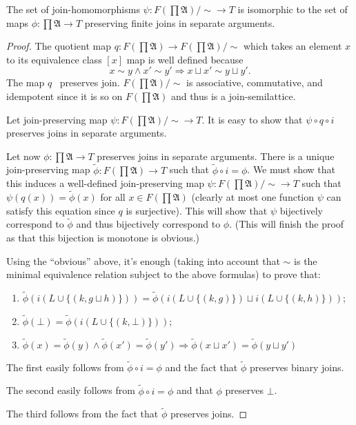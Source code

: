 \begin{lem}
  The set of join-homomorphisms $\psi : F \left( \prod \mathfrak{A} \right) / \sim
  \rightarrow T$ is isomorphic to the set of maps $\phi :
  \prod \mathfrak{A} \rightarrow T$ preserving finite joins in separate arguments.
\end{lem}

\begin{proof}
  The quotient map $q : F \left( \prod \mathfrak{A} \right) \rightarrow F
  \left( \prod \mathfrak{A} \right) / \sim$ which takes an element $x$ to its
  equivalence class $[x]$ map is well defined because
  \[ x \sim y \wedge x' \sim y' \Rightarrow x \sqcup x' \sim y \sqcup y' . \]
  The map $q$ \ preserves join. $F \left( \prod \mathfrak{A} \right) / \sim$
  is associative, commutative, and idempotent since it is so on $F \left(
  \prod \mathfrak{A} \right)$ and thus is a join-semilattice.
  
  Let join-preserving map $\psi : F \left( \prod \mathfrak{A} \right) / \sim
  \rightarrow T$. It is easy to show that $\psi \circ q \circ i$ preserves
  joins in separate arguments.
  
  Let now $\phi : \prod \mathfrak{A} \rightarrow T$ preserves joins in
  separate arguments. There is a unique join-preserving map $\tilde{\phi} : F
  \left( \prod \mathfrak{A} \right) \rightarrow T$ such that $\tilde{\phi}
  \circ i = \phi$. We must show that this induces a well-defined
  join-preserving map $\psi : F \left( \prod \mathfrak{A} \right) / \sim
  \rightarrow T$ such that $\psi (q (x)) = \tilde{\phi} (x)$ for all $x \in F
  \left( \prod \mathfrak{A} \right)$ (clearly at most one function $\psi$ can
  satisfy this equation since $q$ is surjective). This will show that $\psi$
  bijectively correspond to $\tilde{\phi}$ and thus bijectively correspond to
  $\phi$. (This will finish the proof as that this bijection is monotone is
  obvious.)
  
  Using the ``obvious'' above, it's enough (taking into account that $\sim$ is
  the minimal equivalence relation subject to the above formulas) to prove
  that:
  \begin{enumerate}
    \item $\tilde{\phi} (i (L \cup \{ (k , g \sqcup h) \})) = \tilde{\phi} (i
    (L \cup \{ (k , g) \}) \sqcup i (L \cup \{ (k , h) \}))$;
    
    \item $\tilde{\phi} (\bot) = \tilde{\phi} (i (L \cup \{ (k , \bot) \}))$;
    
    \item $\tilde{\phi} (x) = \tilde{\phi} (y) \wedge \tilde{\phi} (x') =
    \tilde{\phi} (y') \Rightarrow \tilde{\phi} (x \sqcup x') = \tilde{\phi} (y
    \sqcup y')$
  \end{enumerate}
  The first easily follows from $\tilde{\phi} \circ i = \phi$ and the fact
  that $\tilde{\phi}$ preserves binary joins.
  
  The second easily follows from $\tilde{\phi} \circ i = \phi$ and that $\phi$
  preserves $\bot$.
  
  The third follows from the fact that $\tilde{\phi}$ preserves joins.
\end{proof}

